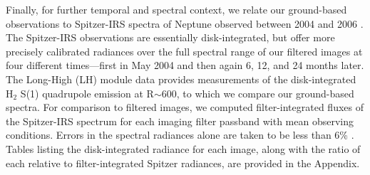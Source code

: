 \documentclass[twocolumn,10pt]{aastex631}
\begin{document}
Finally, for further temporal and spectral context, we relate our ground-based observations to Spitzer-IRS spectra of Neptune observed between 2004 and 2006 \citep{rowe2021neptune}. The Spitzer-IRS observations are essentially disk-integrated, but offer more precisely calibrated radiances over the full spectral range of our filtered images at four different times---first in May 2004 and then again 6, 12, and 24 months later. The Long-High (LH) module data provides measurements of the disk-integrated H$_2$ S(1) quadrupole emission at R$\sim$600, to which we compare our ground-based spectra.  For comparison to filtered images, we computed filter-integrated fluxes of the Spitzer-IRS spectrum for each imaging filter passband with mean observing conditions. Errors in the spectral radiances alone are taken to be less than 6\% \citep{rowe2021neptune}. Tables listing the disk-integrated radiance for each image, along with the ratio of each relative to filter-integrated Spitzer radiances, are provided in the Appendix. 
\end{document}
